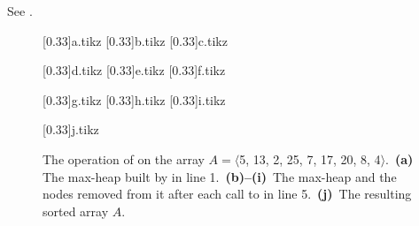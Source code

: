 See .
\begin{figure}[htb]
    \hspace*{-1.5cm}
    \newlength{\figurewidth}\setlength{\figurewidth}{\textwidth+1.5cm}
    \begin{minipage}{\figurewidth}
        \subcaptionbox{\label{fig:6.4-1a}}[0.33\figurewidth]{{a.tikz}}
        \subcaptionbox{\label{fig:6.4-1b}}[0.33\figurewidth]{{b.tikz}}
        \subcaptionbox{\label{fig:6.4-1c}}[0.33\figurewidth]{{c.tikz}}
        \par\vspace{1.5\vertexsize}
        \subcaptionbox{\label{fig:6.4-1d}}[0.33\figurewidth]{{d.tikz}}
        \subcaptionbox{\label{fig:6.4-1e}}[0.33\figurewidth]{{e.tikz}}
        \subcaptionbox{\label{fig:6.4-1f}}[0.33\figurewidth]{{f.tikz}}
        \par\vspace{1.5\vertexsize}
        \subcaptionbox{\label{fig:6.4-1g}}[0.33\figurewidth]{{g.tikz}}
        \subcaptionbox{\label{fig:6.4-1h}}[0.33\figurewidth]{{h.tikz}}
        \subcaptionbox{\label{fig:6.4-1i}}[0.33\figurewidth]{{i.tikz}}
        \par\vspace{1.5\vertexsize}
        \subcaptionbox{\label{fig:6.4-1j}}[0.33\figurewidth]{{j.tikz}}
    \end{minipage}
    \caption{The operation of  on the array $A=\langle$5, 13, 2, 25, 7, 17, 20, 8, 4$\rangle$.\,
    \textbf{(a)}\, The max-heap built by  in line 1.\,
    \textbf{(b)--(i)}\, The max-heap and the nodes removed from it after each call to  in line 5.\,
    \textbf{(j)}\, The resulting sorted array $A$.} \label{fig:6.4-1}
\end{figure}
